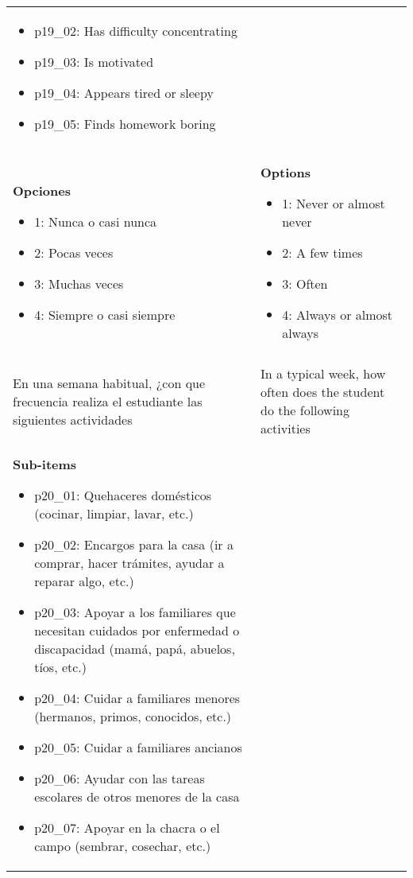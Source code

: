 \documentclass[11pt]{article}
\begin{document}
\begin{longtable}{@{}LL@{}}
\begin{itemize}[leftmargin=*]
\item p19\_02: Has difficulty concentrating
\item p19\_03: Is motivated
\item p19\_04: Appears tired or sleepy
\item p19\_05: Finds homework boring\end{itemize} \\
\textbf{Opciones}\par\begin{itemize}[leftmargin=*]\item 1: Nunca o casi nunca
\item 2: Pocas veces
\item 3: Muchas veces
\item 4: Siempre o casi siempre\end{itemize} & \textbf{Options}\par\begin{itemize}[leftmargin=*]\item 1: Never or almost never
\item 2: A few times
\item 3: Often
\item 4: Always or almost always\end{itemize} \\
\addlinespace[4pt]
 \\ 
En una semana habitual, ¿con que frecuencia realiza el estudiante las siguientes actividades & In a typical week, how often does the student do the following activities \\
\textbf{Sub-items}\par\begin{itemize}[leftmargin=*]\item p20\_01: Quehaceres domésticos (cocinar, limpiar, lavar, etc.)
\item p20\_02: Encargos para la casa (ir a comprar, hacer trámites, ayudar a reparar algo, etc.)
\item p20\_03: Apoyar a los familiares que necesitan cuidados por enfermedad o discapacidad (mamá, papá, abuelos, tíos, etc.)
\item p20\_04: Cuidar a familiares menores (hermanos, primos, conocidos, etc.)
\item p20\_05: Cuidar a familiares ancianos
\item p20\_06: Ayudar con las tareas escolares de otros menores de la casa
\item p20\_07: Apoyar en la chacra o el campo (sembrar, cosechar, etc.)

\end{itemize}
\end{longtable}
\end{document}

